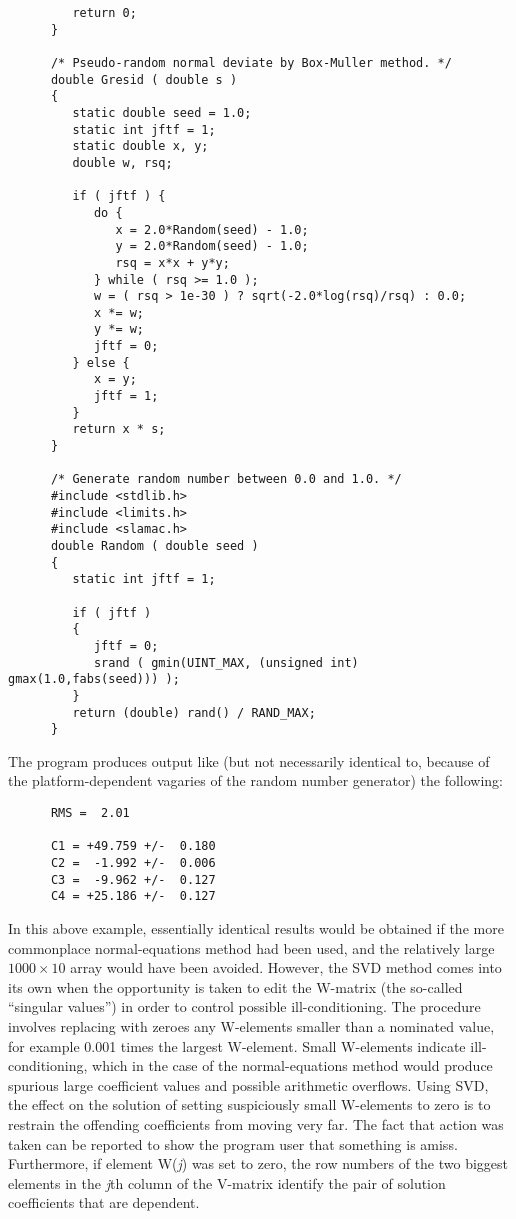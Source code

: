 \documentclass[11pt,fleqn,twoside]{article}
\renewcommand{\_}{{\tt\char'137}}     %
\begin{document}
\begin{verbatim}
         return 0;
      }

      /* Pseudo-random normal deviate by Box-Muller method. */
      double Gresid ( double s )
      {
         static double seed = 1.0;
         static int jftf = 1;
         static double x, y;
         double w, rsq;

         if ( jftf ) {
            do {
               x = 2.0*Random(seed) - 1.0;
               y = 2.0*Random(seed) - 1.0;
               rsq = x*x + y*y;
            } while ( rsq >= 1.0 );
            w = ( rsq > 1e-30 ) ? sqrt(-2.0*log(rsq)/rsq) : 0.0;
            x *= w;
            y *= w;
            jftf = 0;
         } else {
            x = y;
            jftf = 1;
         }
         return x * s;
      }

      /* Generate random number between 0.0 and 1.0. */
      #include <stdlib.h>
      #include <limits.h>
      #include <slamac.h>
      double Random ( double seed )
      {
         static int jftf = 1;

         if ( jftf )
         {
            jftf = 0;
            srand ( gmin(UINT_MAX, (unsigned int) gmax(1.0,fabs(seed))) );
         }
         return (double) rand() / RAND_MAX;
      }
\end{verbatim}
\vspace{-3ex}
\goodbreak
The program produces output like (but not necessarily
identical to, because of the platform-dependent vagaries of the random
number generator) the following:
\goodbreak
\vspace{-3ex}
\begin{verbatim}
      RMS =  2.01

      C1 = +49.759 +/-  0.180
      C2 =  -1.992 +/-  0.006
      C3 =  -9.962 +/-  0.127
      C4 = +25.186 +/-  0.127
\end{verbatim}
\vspace{-3ex}
\goodbreak
In this above example, essentially
identical results would be obtained if the more
commonplace normal-equations method had been used,
and the relatively large
$1000\times 10$ array would have been avoided.  However, the SVD method
comes into its own when the opportunity is taken to edit the W-matrix
(the so-called ``singular values'') in order to control
possible ill-conditioning.  The procedure involves replacing with
zeroes any W-elements smaller than a nominated value, for example
0.001 times the largest W-element.  Small W-elements indicate
ill-conditioning, which in the case of the normal-equations
method would produce spurious large coefficient values and
possible arithmetic overflows.  Using SVD, the effect on the solution
of setting suspiciously small W-elements to zero is to restrain
the offending coefficients from moving very far.  The
fact that action was taken can be reported to show the program user that
something is amiss.  Furthermore, if element W({\it j}\/) was set to zero,
the row numbers of the two biggest elements in the
{\it j}\/th column of the
V-matrix identify the pair of solution coefficients that are
dependent.
 
\end{document}
